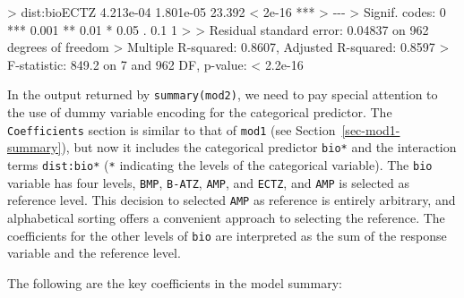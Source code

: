 \documentclass[
  letterpaper,
]{book}
\newenvironment{Shaded}{\begin{snugshade}}{\end{snugshade}}
\newcommand{\DecValTok}[1]{\textcolor[rgb]{0.68,0.00,0.00}{#1}}
\newcommand{\ErrorTok}[1]{\textcolor[rgb]{0.68,0.00,0.00}{#1}}
\newcommand{\FloatTok}[1]{\textcolor[rgb]{0.68,0.00,0.00}{#1}}
\newcommand{\NormalTok}[1]{\textcolor[rgb]{0.00,0.23,0.31}{#1}}
\newcommand{\SpecialCharTok}[1]{\textcolor[rgb]{0.37,0.37,0.37}{#1}}
\newcommand{\StringTok}[1]{\textcolor[rgb]{0.13,0.47,0.30}{#1}}
\begin{document}
\begin{Shaded}
\begin{Highlighting}[]
\ErrorTok{\textgreater{}}\NormalTok{ dist}\SpecialCharTok{:}\NormalTok{bioECTZ   }\FloatTok{4.213e{-}04}  \FloatTok{1.801e{-}05}  \FloatTok{23.392}  \SpecialCharTok{\textless{}} \FloatTok{2e{-}16} \SpecialCharTok{**}\ErrorTok{*}
\ErrorTok{\textgreater{}} \SpecialCharTok{{-}{-}{-}}
\ErrorTok{\textgreater{}}\NormalTok{ Signif. codes}\SpecialCharTok{:}  \DecValTok{0} \StringTok{\textquotesingle{}***\textquotesingle{}} \FloatTok{0.001} \StringTok{\textquotesingle{}**\textquotesingle{}} \FloatTok{0.01} \StringTok{\textquotesingle{}*\textquotesingle{}} \FloatTok{0.05} \StringTok{\textquotesingle{}.\textquotesingle{}} \FloatTok{0.1} \StringTok{\textquotesingle{} \textquotesingle{}} \DecValTok{1}
\SpecialCharTok{\textgreater{}} 
\ErrorTok{\textgreater{}}\NormalTok{ Residual standard error}\SpecialCharTok{:} \FloatTok{0.04837}\NormalTok{ on }\DecValTok{962}\NormalTok{ degrees of freedom}
\SpecialCharTok{\textgreater{}}\NormalTok{ Multiple R}\SpecialCharTok{{-}}\NormalTok{squared}\SpecialCharTok{:}  \FloatTok{0.8607}\NormalTok{,  Adjusted R}\SpecialCharTok{{-}}\NormalTok{squared}\SpecialCharTok{:}  \FloatTok{0.8597} 
\SpecialCharTok{\textgreater{}}\NormalTok{ F}\SpecialCharTok{{-}}\NormalTok{statistic}\SpecialCharTok{:} \FloatTok{849.2}\NormalTok{ on }\DecValTok{7}\NormalTok{ and }\DecValTok{962}\NormalTok{ DF,  p}\SpecialCharTok{{-}}\NormalTok{value}\SpecialCharTok{:} \ErrorTok{\textless{}} \FloatTok{2.2e{-}16}
\end{Highlighting}
\end{Shaded}

In the output returned by \texttt{summary(mod2)}, we need to pay special
attention to the use of dummy variable encoding for the categorical
predictor. The \texttt{Coefficients} section is similar to that of
\texttt{mod1} (see Section~\ref{sec-mod1-summary}), but now it includes
the categorical predictor \texttt{bio*} and the interaction terms
\texttt{dist:bio*} (\texttt{*} indicating the levels of the categorical
variable). The \texttt{bio} variable has four levels, \texttt{BMP},
\texttt{B-ATZ}, \texttt{AMP}, and \texttt{ECTZ}, and \texttt{AMP} is
selected as reference level. This decision to selected \texttt{AMP} as
reference is entirely arbitrary, and alphabetical sorting offers a
convenient approach to selecting the reference. The coefficients for the
other levels of \texttt{bio} are interpreted as the sum of the response
variable and the reference level.

The following are the key coefficients in the model summary:
\end{document}
